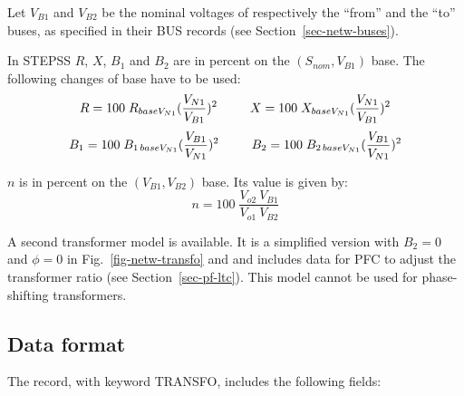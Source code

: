 Let $V_{B1}$ and $V_{B2}$ be the nominal voltages of respectively the ``from'' and the ``to'' buses, as specified in their BUS records (see Section~\ref{sec-netw-buses}). 

In STEPSS $R$, $X$, $B_1$ and $B_2$ are in percent on the $(S_{nom},V_{B1})$ base. The following changes of base have to be used:
\[  R = 100 \; R_{baseV_{N1}}(\frac{V_{N1}}{V_{B1}})^2 \hspace*{6ex} X = 100 \; X_{baseV_{N1}}(\frac{V_{N1}}{V_{B1}})^2 \]
\[  B_1 = 100 \; B_{1 \, baseV_{N1}}(\frac{V_{B1}}{V_{N1}})^2 \hspace*{6ex} B_2 = 100 \; B_{2 \, baseV_{N1}}(\frac{V_{B1}}{V_{N1}})^2 \]

$n$ is in percent on the $(V_{B1}, V_{B2})$ base. Its value is given by:
\[ n = 100 \; \frac{V_{o2}\: V_{B1}}{V_{o1}\: V_{B2}} \]

A second transformer model is available. It is a simplified version with $B_2=0$ and $\phi=0$ in Fig.~\ref{fig-netw-transfo} and and includes data for PFC to adjust the transformer ratio (see Section~\ref{sec-pf-ltc}). This model cannot be used for phase-shifting transformers.


\subsection{Data format}\label{sec-netw-trfo}

The record, with keyword TRANSFO, includes the following fields:

\hspace*{5ex}{\tt TRANSFO NAME FROMBUS TOBUS R X B1 B2 N PHI SNOM BR ;}

